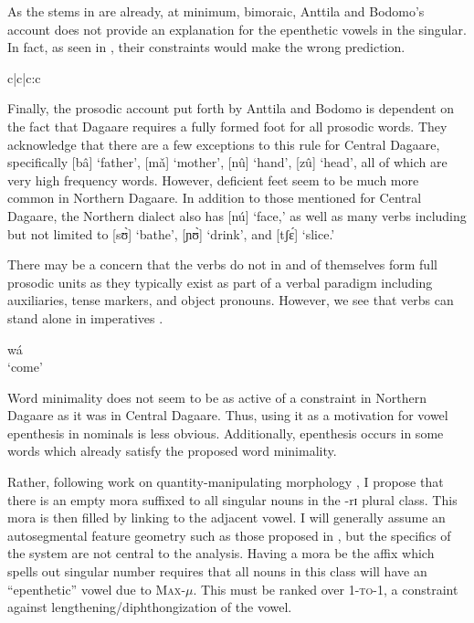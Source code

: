 \documentclass[output=paper,colorlinks,citecolor=brown,
]{langscibook}
\begin{document}
As the stems in  are already, at minimum, bimoraic, Anttila and Bodomo’s account does not provide an explanation for the epenthetic vowels in the singular. In fact, as seen in , their constraints would make the wrong prediction. 

\begin{table}
  \caption{Tableau of the failed derivation of [nóbíé] `finger' in ND}
  \label{tab:Caragine:finger}

\begin{tableau}{c|c|c:c} 
\const{*I]} 
 \vio{} \vio{} \vio{*} \vio{} 
 \vio{} \vio{*!} \vio{} \vio{} 
 \vio{} \vio{*!} \vio{*} \vio{} 
\end{tableau}
\end{table}

Finally, the prosodic account put forth by Anttila and Bodomo is dependent on the fact that Dagaare requires a fully formed foot for all prosodic words. They acknowledge that there are a few exceptions to this rule for Central Dagaare, specifically [bâ] ‘father’, [mǎ] ‘mother’, [nû] ‘hand’, [zû] ‘head’, all of which are very high frequency words. However, deficient feet seem to be much more common in Northern Dagaare. In addition to those mentioned for Central Dagaare, the Northern dialect also has [nú] ‘face,’ as well as many verbs including but not limited to [sʊ̀] ‘bathe’, [ɲʊ̀] ‘drink’, and [tʃɛ́] ‘slice.’ 

There may  be a concern that the verbs do not in and of themselves form full prosodic units as they typically exist as part of a verbal paradigm including auxiliaries, tense markers, and object pronouns. However, we see that verbs can stand alone in imperatives .

\ea \label{ex:Caragine:come}
wá \\
‘come’
\z

Word minimality does not seem to be as active of a constraint in Northern Dagaare as it was in Central Dagaare. Thus, using it as a motivation for vowel epenthesis in nominals is less obvious. Additionally, epenthesis occurs in some words which already satisfy the proposed word minimality.

Rather, following work on quantity-manipulating morphology \citep{fujimura, trommer}, I propose that there is an empty mora suffixed to all singular nouns in the -rɪ plural class. This mora is then filled by linking to the adjacent vowel. I will generally assume an autosegmental feature geometry such as those proposed in \citet{Clements}, but the specifics of the system are not central to the analysis. Having a mora be the affix which spells out singular number requires that all nouns in this class will have an ``epenthetic'' vowel due to \textsc{Max}-$\mu$. This must be ranked over \textsc{1-to-1}, a constraint against lengthening/diphthongization of the vowel.
\end{document}
